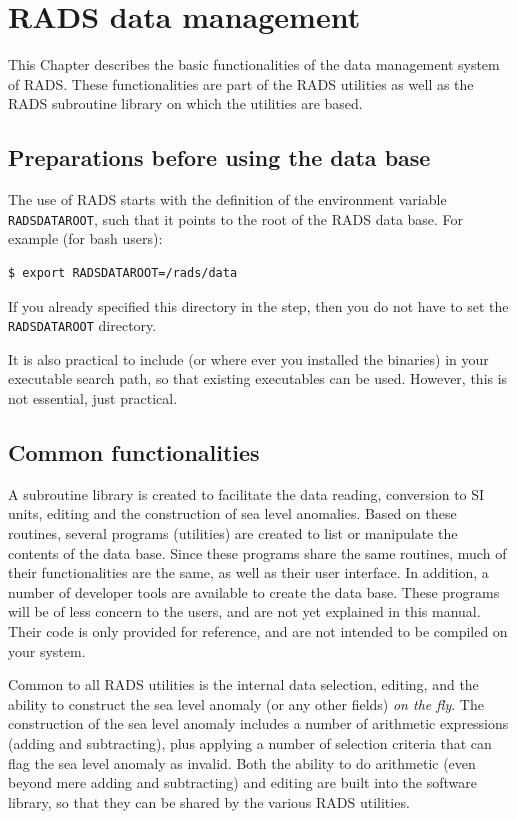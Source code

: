 \documentclass[a4paper,11pt,openany,natbib,nomargin]{thesis}
\begin{document}
\chapter{RADS data management}
\label{ch:management}

This Chapter describes the basic functionalities of the data management system of RADS. These functionalities are part of the RADS utilities as well as the RADS subroutine library on which the utilities are based.

\section{Preparations before using the data base}

The use of RADS starts with the definition of the environment variable \verb|RADSDATAROOT|, such that it points to the root of the RADS data base. For example (for bash users):
\begin{verbatim}
$ export RADSDATAROOT=/rads/data
\end{verbatim}
If you already specified this directory in the  step, then you do not have to set the \verb|RADSDATAROOT| directory.

It is also practical to include  (or where ever you installed the binaries) in your executable search path, so that existing executables can be used. However, this is not essential, just practical.

\section{Common functionalities}
A subroutine library is created to facilitate the data reading, conversion to SI units, editing and the construction of sea level anomalies. Based on these routines, several programs (utilities) are created to list or manipulate the contents of the data base. Since these programs share the same routines, much of their functionalities are the same, as well as their user interface. In addition, a number of developer tools are available to create the data base. These programs will be of less concern to the users, and are not yet explained in this manual. Their code is only provided for reference, and are not intended to be compiled on your system.

Common to all RADS utilities is the internal data selection, editing, and the ability to construct the sea level anomaly (or any other fields) \emph{on the fly}. The construction of the sea level anomaly includes a number of arithmetic expressions (adding and subtracting), plus applying a number of selection criteria that can flag the sea level anomaly as invalid. Both the ability to do arithmetic (even beyond mere adding and subtracting) and editing are built into the software library, so that they can be shared by the various RADS utilities.
\end{document}
